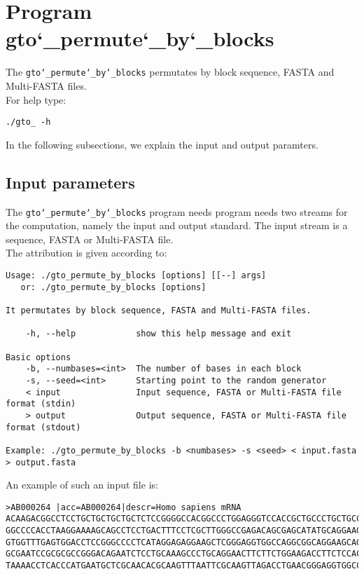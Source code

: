\section{Program gto\char`_permute\char`_by\char`_blocks}
The \texttt{gto\char`_permute\char`_by\char`_blocks} permutates by block sequence, FASTA and Multi-FASTA files.\\
For help type:
\begin{lstlisting}
./gto_ -h
\end{lstlisting}
In the following subsections, we explain the input and output paramters.

\subsection*{Input parameters}

The \texttt{gto\char`_permute\char`_by\char`_blocks} program needs program needs two streams for the computation, namely the input and output standard. The input stream is a sequence, FASTA or Multi-FASTA file.\\
The attribution is given according to:
\begin{lstlisting}
Usage: ./gto_permute_by_blocks [options] [[--] args]
   or: ./gto_permute_by_blocks [options]

It permutates by block sequence, FASTA and Multi-FASTA files.

    -h, --help            show this help message and exit

Basic options
    -b, --numbases=<int>  The number of bases in each block
    -s, --seed=<int>      Starting point to the random generator
    < input               Input sequence, FASTA or Multi-FASTA file format (stdin)
    > output              Output sequence, FASTA or Multi-FASTA file format (stdout)

Example: ./gto_permute_by_blocks -b <numbases> -s <seed> < input.fasta > output.fasta
\end{lstlisting}
An example of such an input file is:
\begin{lstlisting}
>AB000264 |acc=AB000264|descr=Homo sapiens mRNA 
ACAAGACGGCCTCCTGCTGCTGCTGCTCTCCGGGGCCACGGCCCTGGAGGGTCCACCGCTGCCCTGCTGCCATTGTCCCC
GGCCCCACCTAAGGAAAAGCAGCCTCCTGACTTTCCTCGCTTGGGCCGAGACAGCGAGCATATGCAGGAAGCGGCAGGAA
GTGGTTTGAGTGGACCTCCGGGCCCCTCATAGGAGAGGAAGCTCGGGAGGTGGCCAGGCGGCAGGAAGCAGGCCAGTGCC
GCGAATCCGCGCGCCGGGACAGAATCTCCTGCAAAGCCCTGCAGGAACTTCTTCTGGAAGACCTTCTCCACCCCCCCAGC
TAAAACCTCACCCATGAATGCTCGCAACACGCAAGTTTAATTCGCAAGTTAGACCTGAACGGGAGGTGGCCACGCAAGTT
\end{lstlisting}

